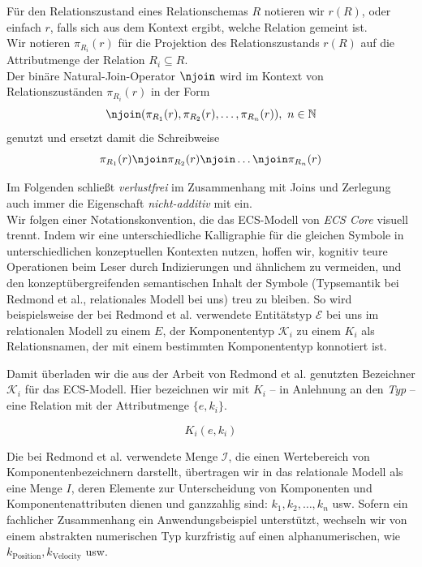 \noindent
Für den Relationszustand eines Relationschemas $R$ notieren wir $r(R)$, oder einfach $r$, falls sich aus dem Kontext ergibt, welche Relation gemeint ist.\\

\noindent
Wir notieren $\pi_{R_i}(r)$ für die Projektion des Relationszustands $r(R)$ auf die Attributmenge der Relation $R_i \subseteq R$.\\

\noindent
Der binäre Natural-Join-Operator $\njoin$ wird im Kontext von Relationszuständen $\pi_{R_i}(r)$ in der Form
\[
    \njoin (\pi_{R_1}(r), \pi_{R_2}(r), \ldots, \pi_{R_n}(r)),\ n \in \mathbb{N}
\]
\noindent
genutzt und ersetzt damit die Schreibweise
\[
    \pi_{R_1}(r) \njoin \pi_{R_{2}}(r) \njoin \ldots \njoin \pi_{R_n}(r)
\]
\medskip

\noindent
Im Folgenden schließt \textit{verlustfrei} im Zusammenhang mit Joins und Zerlegung auch immer die Eigenschaft \textit{nicht-additiv} mit ein.\\

\noindent
Wir folgen einer Notationskonvention, die das ECS-Modell von \textit{ECS Core} visuell trennt.
Indem wir eine unterschiedliche Kalligraphie für die gleichen Symbole in unterschiedlichen konzeptuellen Kontexten nutzen, hoffen wir, kognitiv teure Operationen beim Leser durch Indizierungen und ähnlichem zu vermeiden, und den konzeptübergreifenden semantischen Inhalt der Symbole (Typsemantik bei Redmond et al., relationales Modell bei uns) treu zu bleiben.
So wird beispielsweise der bei Redmond et al. verwendete Entitätstyp $\mathcal{E}$ bei uns im relationalen Modell zu einem $E$, der Komponententyp $\mathcal{K}_i$ zu einem $K_i$ als Relationsnamen, der mit einem bestimmten Komponententyp konnotiert ist.

Damit überladen wir die aus der Arbeit von Redmond et al. genutzten Bezeichner $\mathcal{K}_i$ für das ECS-Modell.
Hier bezeichnen wir mit $K_i$ -- in Anlehnung an den \textit{Typ} -- eine Relation mit der Attributmenge $\{e, k_i\}$.

\[
    K_i(e, k_i)
\]

Die bei Redmond et al. verwendete Menge $\mathcal{I}$, die einen Wertebereich von Komponentenbezeichnern darstellt, übertragen wir in das relationale Modell als eine Menge $I$, deren Elemente zur Unterscheidung von Komponenten und Komponentenattributen dienen und ganzzahlig sind: $k_1, k_2, \ldots, k_n$ usw.
Sofern ein fachlicher Zusammenhang ein Anwendungsbeispiel unterstützt, wechseln wir von einem abstrakten numerischen Typ kurzfristig auf einen alphanumerischen, wie $k_\text{Position}, k_\text{Velocity}$ usw.\\


